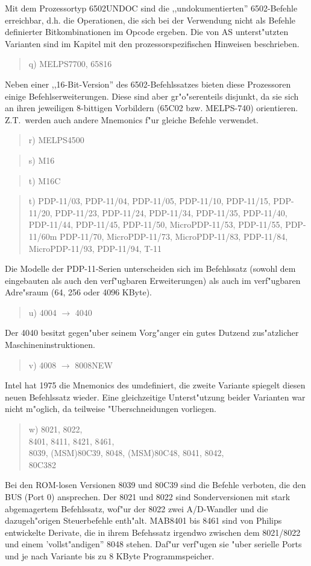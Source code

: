 \documentclass[12pt,a4paper,twoside]{report}
\begin{document}
Mit dem Prozessortyp 6502UNDOC sind die ,,undokumentierten''
6502-Befehle erreichbar, d.h. die Operationen, die sich bei der Verwendung
nicht als Befehle definierter Bitkombinationen im Opcode ergeben.  Die von
AS unterst"utzten Varianten sind im Kapitel mit den prozessorspezifischen
Hinweisen beschrieben.
\begin{quote}
q) MELPS7700, 65816
\end{quote}
Neben einer ,,16-Bit-Version'' des 6502-Befehlssatzes bieten diese
Prozessoren einige Befehlserweiterungen.  Diese sind aber gr"o"serenteils
disjunkt, da sie sich an ihren jeweiligen 8-bittigen Vorbildern (65C02
bzw. MELPS-740) orientieren.  Z.T.~werden auch andere Mnemonics f"ur
gleiche Befehle verwendet.
\begin{quote}
r) MELPS4500
\end{quote}
\begin{quote}
s) M16
\end{quote}
\begin{quote}
t) M16C
\end{quote}
\begin{quote}
t) PDP-11/03, PDP-11/04, PDP-11/05, PDP-11/10,
   PDP-11/15, PDP-11/20, PDP-11/23, PDP-11/24,
   PDP-11/34, PDP-11/35, PDP-11/40, PDP-11/44,
   PDP-11/45, PDP-11/50, MicroPDP-11/53,
   PDP-11/55, PDP-11/60m PDP-11/70, MicroPDP-11/73,
   MicroPDP-11/83, PDP-11/84, MicroPDP-11/93,
   PDP-11/94, T-11
\end{quote}
Die Modelle der PDP-11-Serien unterscheiden sich im
Befehlssatz (sowohl dem eingebauten als auch den verf"ugbaren
Erweiterungen) als auch im verf"ugbaren Adre"sraum (64, 256
oder 4096 KByte).
\begin{quote}
u) 4004 $\rightarrow$ 4040
\end{quote}
Der 4040 besitzt gegen"uber seinem Vorg"anger ein gutes Dutzend
zus"atzlicher Maschineninstruktionen.
\begin{quote}
v) 4008 $\rightarrow$ 8008NEW
\end{quote}
Intel hat 1975 die Mnemonics des umdefiniert, die zweite Variante spiegelt
diesen neuen Befehlssatz wieder.  Eine gleichzeitige Unterst"utzung beider
Varianten war nicht m"oglich, da teilweise "Uberschneidungen vorliegen.
\begin{quote}
w) 8021, 8022, \\
   8401, 8411, 8421, 8461, \\
   8039, (MSM)80C39, 8048, (MSM)80C48, 8041, 8042, \\
   80C382
\end{quote}
Bei den ROM-losen Versionen 8039 und 80C39 sind die Befehle verboten,
die den BUS (Port 0) ansprechen.  Der 8021 und 8022 sind Sonderversionen
mit stark abgemagertem Befehlssatz, wof"ur der 8022 zwei A/D-Wandler
und die dazugeh"origen Steuerbefehle enth"alt.  MAB8401 bis 8461 sind von
Philips entwickelte Derivate, die in ihrem Befehssatz irgendwo zwischen
dem 8021/8022 und einem 'vollst"andigen'' 8048 stehen.  Daf"ur verf"ugen
sie "uber serielle Ports und je nach Variante bis zu 8 KByte Programmspeicher.
\end{document}
